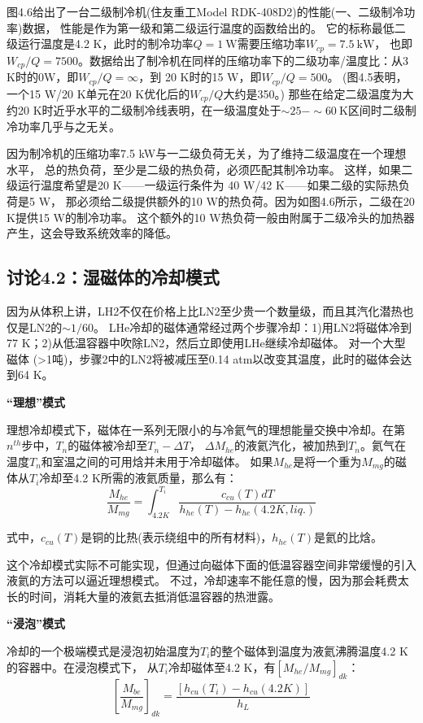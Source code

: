 图4.6给出了一台二级制冷机(住友重工Model RDK-408D2)的性能(一、二级制冷功率)数据，
性能是作为第一级和第二级运行温度的函数给出的。
它的标称最低二级运行温度是4.2 K，此时的制冷功率$Q=1\ \mathrm{W}$需要压缩功率$W_{cp}=7.5\ \mathrm{kW}$，
也即$W_{cp}/Q = 7500$。数据给出了制冷机在同样的压缩功率下的二级功率/温度比：从3 K时的0W，即$W_{cp}/Q = \infty$，到
20 K时的15 W，即$W_{cp}/Q = 500$。 (图4.5表明，一个15 W/20 K单元在20 K优化后的$W_{cp}/Q$大约是350。)
那些在给定二级温度为大约20 K时近乎水平的二级制冷线表明，在一级温度处于$\sim 25-\sim 60\ \mathrm{K}$区间时二级制冷功率几乎与之无关。

因为制冷机的压缩功率7.5 kW与一二级负荷无关，为了维持二级温度在一个理想水平，
总的热负荷，至少是二级的热负荷，必须匹配其制冷功率。
这样，如果二级运行温度希望是20 K——一级运行条件为 40 W/42 K——如果二级的实际热负荷是5 W，
那必须给二级提供额外的10 W的热负荷。因为如图4.6所示，二级在20 K提供15 W的制冷功率。
这个额外的10 W热负荷一般由附属于二级冷头的加热器产生，这会导致系统效率的降低。


\subsection{讨论4.2：湿磁体的冷却模式}
因为从体积上讲，LH2不仅在价格上比LN2至少贵一个数量级，而且其汽化潜热也仅是LN2的$\sim 1/60$。
LHe冷却的磁体通常经过两个步骤冷却：1)用LN2将磁体冷到77 K；2)从低温容器中吹除LN2，然后立即使用LHe继续冷却磁体。
对一个大型磁体 (>1吨)，步骤2中的LN2将被减压至0.14 atm以改变其温度，此时的磁体会达到64 K。

\textbf{“理想”模式}

理想冷却模式下，磁体在一系列无限小的与冷氦气的理想能量交换中冷却。在第$n^{th}$步中，$T_n$的磁体被冷却至$T_n-\Delta T$，
$\Delta M_{he}$的液氦汽化，被加热到$T_n$。氦气在温度$T_n$和室温之间的可用焓并未用于冷却磁体。
如果$M_{he}$是将一个重为$M_{mg}$的磁体从$T_i$冷却至4.2 K所需的液氦质量，那么有：
\begin{equation}%
\frac{M_{he}}{M_{mg}}=\int_{4.2K}^{T_i}\frac{c_{cu}(T)dT}{h_{he}(T)-h_{he}(4.2K,liq.)}
\end{equation}

式中，$c_{cu}(T)$是铜的比热(表示绕组中的所有材料)，$h_{he}(T)$是氦的比焓。

这个冷却模式实际不可能实现，但通过向磁体下面的低温容器空间非常缓慢的引入液氦的方法可以逼近理想模式。
不过，冷却速率不能任意的慢，因为那会耗费太长的时间，消耗大量的液氦去抵消低温容器的热泄露。

\textbf{“浸泡”模式}

冷却的一个极端模式是浸泡初始温度为$T_i$的整个磁体到温度为液氦沸腾温度4.2 K的容器中。在浸泡模式下，
从$T_i$冷却磁体至4.2 K，有$[M_{he}/M_{mg}]_{dk}$：
\begin{equation}%
\left[\frac{M_{be}}{M_{mg}}\right]_{dk}=\frac{[h_{cu}(T_i)-h_{cu}(4.2K)]}{h_L}
\end{equation}

